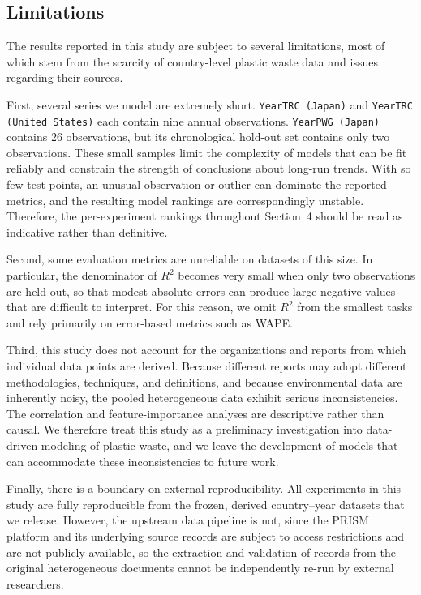 \subsection{Limitations}

The results reported in this study are subject to several limitations, most of which stem from the scarcity of country-level plastic waste data and issues regarding their sources.

First, several series we model are extremely short. \texttt{YearTRC (Japan)} and \texttt{YearTRC (United States)} each contain nine annual observations. \texttt{YearPWG (Japan)} contains 26 observations, but its chronological hold-out set contains only two observations. These small samples limit the complexity of models that can be fit reliably and constrain the strength of conclusions about long-run trends. With so few test points, an unusual observation or outlier can dominate the reported metrics, and the resulting model rankings are correspondingly unstable. Therefore, the per-experiment rankings throughout Section~4 should be read as indicative rather than definitive.

Second, some evaluation metrics are unreliable on datasets of this size. In particular, the denominator of \(R^2\) becomes very small when only two observations are held out, so that modest absolute errors can produce large negative values that are difficult to interpret. For this reason, we omit \(R^2\) from the smallest tasks and rely primarily on error-based metrics such as WAPE.

Third, this study does not account for the organizations and reports from which individual data points are derived. Because different reports may adopt different methodologies, techniques, and definitions, and because environmental data are inherently noisy, the pooled heterogeneous data exhibit serious inconsistencies. The correlation and feature-importance analyses are descriptive rather than causal. We therefore treat this study as a preliminary investigation into data-driven modeling of plastic waste, and we leave the development of models that can accommodate these inconsistencies to future work.

Finally, there is a boundary on external reproducibility. All experiments in this study are fully reproducible from the frozen, derived country--year datasets that we release. However, the upstream data pipeline is not, since the PRISM platform and its underlying source records are subject to access restrictions and are not publicly available, so the extraction and validation of records from the original heterogeneous documents cannot be independently re-run by external researchers.
